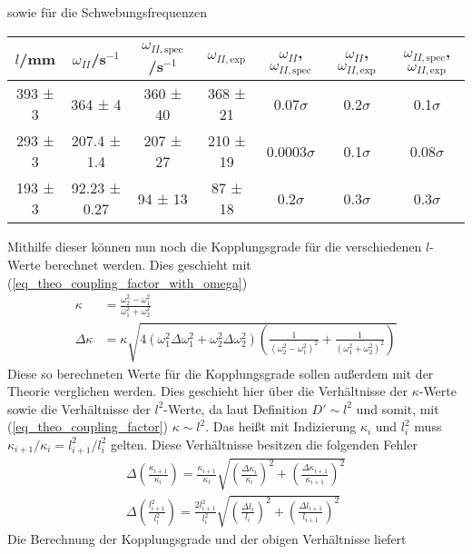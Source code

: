 \documentclass[12pt,a4paper,german]{scrartcl}
\numberwithin{equation}{section}
\begin{document}
  sowie für die Schwebungsfrequenzen

  \begin{center}
    \begin{tabular}{c|c|c|c|c|c|c}
      $l$/mm & $\omega_{II}$/s$^{-1}$ & $\omega_{II,\text{spec}}$/s$^{-1}$ & $\omega_{II,\text{exp}}$ & $\omega_{II}$, $\omega_{II,\text{spec}}$ & $\omega_{II}$, $\omega_{II,\text{exp}}$ & $\omega_{II,\text{spec}}$, $\omega_{II,\text{exp}}$ \\
      \hline
      393 ± 3 &   364 ± 4    & 360 ± 40 & 368 ± 21 &   0.07$\sigma$ & 0.2$\sigma$ &  0.1$\sigma$ \\
      293 ± 3 & 207.4 ± 1.4  & 207 ± 27 & 210 ± 19 & 0.0003$\sigma$ & 0.1$\sigma$ & 0.08$\sigma$ \\
      193 ± 3 & 92.23 ± 0.27 &  94 ± 13 &  87 ± 18 &    0.2$\sigma$ & 0.3$\sigma$ &  0.3$\sigma$
    \end{tabular}
    \label{table_beats_omega_II}
  \end{center}

  Mithilfe dieser können nun noch die Kopplungsgrade für die verschiedenen $l$-Werte berechnet werden.
  Dies geschieht mit (\ref{eq_theo_coupling_factor_with_omega})
  \begin{align}
    \kappa &= \frac{\omega_2^2 - \omega_1^2}{\omega_1^2 + \omega_2^2} \nonumber \\
    \Delta\kappa &= \kappa \sqrt{4 (\omega_1^2 \Delta\omega_1^2 + \omega_2^2 \Delta\omega_2^2) \left(\frac{1}{(\omega_2^2 - \omega_1^2)^2} + \frac{1}{(\omega_1^2 + \omega_2^2)^2} \right)}
    \label{eq_coupling_factor}
  \end{align}
  Diese so berechneten Werte für die Kopplungsgrade sollen außerdem mit der Theorie verglichen werden.
  Dies geschieht hier über die Verhältnisse der $\kappa$-Werte sowie die Verhältnisse der $l^2$-Werte, da laut Definition $D' \sim l^2$ und somit, mit (\ref{eq_theo_coupling_factor}) $\kappa \sim l^2$.
  Das heißt mit Indizierung $\kappa_i$ und $l_i^2$ muss $\kappa_{i+1} / \kappa_i = l_{i+1}^2 / l_i^2$ gelten.
  Diese Verhältnisse besitzen die folgenden Fehler
  \begin{align}
    \Delta\left(\frac{\kappa_{i+1}}{\kappa_i}\right) = \frac{\kappa_{i+1}}{\kappa_i} \sqrt{\left(\frac{\Delta\kappa_i}{\kappa_i} \right)^2 + \left(\frac{\Delta\kappa_{i+1}}{\kappa_{i+1}} \right)^2} \nonumber \\
    \Delta\left(\frac{l_{i+1}^2}{l_i^2}\right) = \frac{2 l_{i+1}^2}{l_i^2} \sqrt{\left(\frac{\Delta l_i}{l_{i}}\right)^2 + \left(\frac{\Delta l_{i+1}}{l_{i+1}}\right)^2}
    \label{eq_coupling_factor_errors}
  \end{align}
  Die Berechnung der Kopplungsgrade und der obigen Verhältnisse liefert
\end{document}
